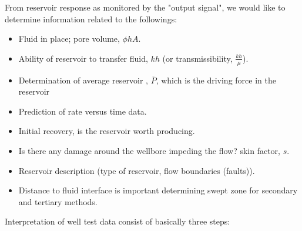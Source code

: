 \documentclass{llncs}
\numberwithin{equation}{section}
\numberwithin{figure}{section}
\numberwithin{table}{section}
\begin{document}
    From reservoir response as monitored by the "output signal", we would like to determine information related to the followings:
    \begin{itemize}
        \item Fluid in place; pore volume, ${\phi}hA$.
        \item Ability of reservoir to transfer fluid, $kh$ (or transmissibility, $\frac{kh}{\mu}$).
        \item Determination of average reservoir , $\overline{P}$, which is the driving force in the reservoir 
        \item Prediction of rate versus time data.
        \item Initial recovery, is the reservoir worth producing.
        \item Is there any damage around the wellbore impeding the flow? skin factor, $s$.
        \item Reservoir description (type of reservoir, flow boundaries (faults)).
        \item Distance to fluid interface  is important determining swept zone for secondary and tertiary methods.
    \end{itemize}
    Interpretation of well test data consist of basically three steps:
\end{document}
